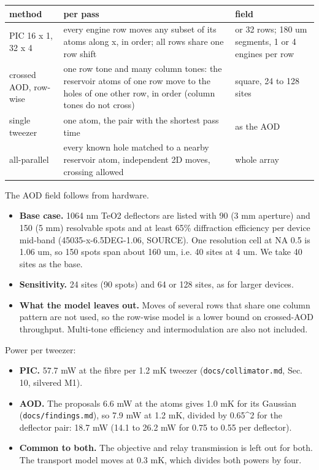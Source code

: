 {\footnotesize
\begin{longtable}[]{@{}>{\raggedright\arraybackslash}p{0.224\dimexpr(\linewidth-6\tabcolsep)\relax}>{\raggedright\arraybackslash}p{0.408\dimexpr(\linewidth-6\tabcolsep)\relax}>{\raggedright\arraybackslash}p{0.367\dimexpr(\linewidth-6\tabcolsep)\relax}@{}}
\toprule\noalign{}
method & per pass & field \\
\midrule\noalign{}
\endhead
\bottomrule\noalign{}
\endlastfoot
PIC 16 x 1, 32 x 4 & every engine row moves any subset of its atoms
along x, in order; all rows share one row shift & 16 or 32 rows; 180 um
segments, 1 or 4 engines per row \\
crossed AOD, row-wise & one row tone and many column tones: the
reservoir atoms of one row move to the holes of one other row, in order
(column tones do not cross) & square, 24 to 128 sites \\
single tweezer & one atom, the pair with the shortest pass time & as the
AOD \\
all-parallel & every known hole matched to a nearby reservoir atom,
independent 2D moves, crossing allowed & whole array \\
\end{longtable}
}

The AOD field follows from hardware.

\begin{itemize}
\tightlist
\item
  \textbf{Base case.} 1064 nm TeO2 deflectors are listed with 90 (3 mm
  aperture) and 150 (5 mm) resolvable spots and at least 65\%
  diffraction efficiency per device mid-band (45035-x-6.5DEG-1.06,
  SOURCE). One resolution cell at NA 0.5 is 1.06 um, so 150 spots span
  about 160 um, i.e. 40 sites at 4 um. We take 40 sites as the base.
\item
  \textbf{Sensitivity.} 24 sites (90 spots) and 64 or 128 sites, as for
  larger devices.
\item
  \textbf{What the model leaves out.} Moves of several rows that share
  one column pattern are not used, so the row-wise model is a lower
  bound on crossed-AOD throughput. Multi-tone efficiency and
  intermodulation are also not included.
\end{itemize}

Power per tweezer:

\begin{itemize}
\tightlist
\item
  \textbf{PIC.} 57.7 mW at the fibre per 1.2 mK tweezer
  (\texttt{docs/collimator.md}, Sec. 10, silvered M1).
\item
  \textbf{AOD.} The proposal\textquotesingle s 6.6 mW at the atoms gives
  1.0 mK for its Gaussian (\texttt{docs/findings.md}), so 7.9 mW at 1.2
  mK, divided by 0.65\^{}2 for the deflector pair: 18.7 mW (14.1 to 26.2
  mW for 0.75 to 0.55 per deflector).
\item
  \textbf{Common to both.} The objective and relay transmission is left
  out for both. The transport model moves at 0.3 mK, which divides both
  powers by four.
\end{itemize}

